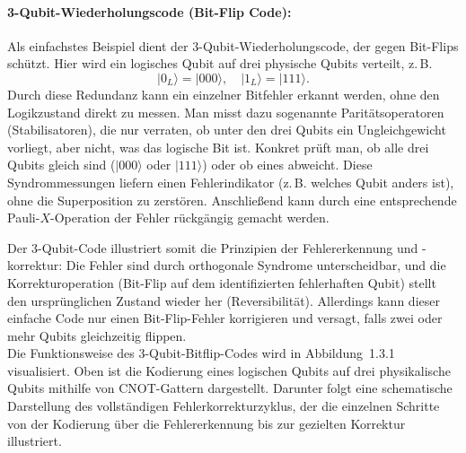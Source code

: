 \paragraph{3-Qubit-Wiederholungscode (Bit-Flip Code):}
Als einfachstes Beispiel dient der 3-Qubit-Wiederholungscode, der gegen Bit-Flips schützt. Hier wird ein logisches Qubit auf drei physische Qubits verteilt, z.\,B.
\[
\lvert 0_L \rangle = \lvert 000 \rangle, \quad \lvert 1_L \rangle = \lvert 111 \rangle.
\]
Durch diese Redundanz kann ein einzelner Bitfehler erkannt werden, ohne den Logikzustand direkt zu messen. Man misst dazu sogenannte Paritätsoperatoren (Stabilisatoren), die nur verraten, ob unter den drei Qubits ein Ungleichgewicht vorliegt, aber nicht, was das logische Bit ist. Konkret prüft man, ob alle drei Qubits gleich sind (\(\lvert 000 \rangle\) oder \(\lvert 111 \rangle\)) oder ob eines abweicht. Diese Syndrommessungen liefern einen Fehlerindikator (z.\,B. welches Qubit anders ist), ohne die Superposition zu zerstören. Anschließend kann durch eine entsprechende Pauli-\(X\)-Operation der Fehler rückgängig gemacht werden.

Der 3-Qubit-Code illustriert somit die Prinzipien der Fehlererkennung und -korrektur: Die Fehler sind durch orthogonale Syndrome unterscheidbar, und die Korrekturoperation (Bit-Flip auf dem identifizierten fehlerhaften Qubit) stellt den ursprünglichen Zustand wieder her (Reversibilität). Allerdings kann dieser einfache Code nur einen Bit-Flip-Fehler korrigieren und versagt, falls zwei oder mehr Qubits gleichzeitig flippen.
\cite[Seite 430-431]{nielsen_quantum_2010}\\

Die Funktionsweise des 3-Qubit-Bitflip-Codes wird in Abbildung~1.3.1 visualisiert. 
Oben ist die Kodierung eines logischen Qubits auf drei physikalische Qubits mithilfe von CNOT-Gattern dargestellt. 
Darunter folgt eine schematische Darstellung des vollständigen Fehlerkorrekturzyklus, 
der die einzelnen Schritte von der Kodierung über die Fehlererkennung bis zur gezielten Korrektur illustriert.

